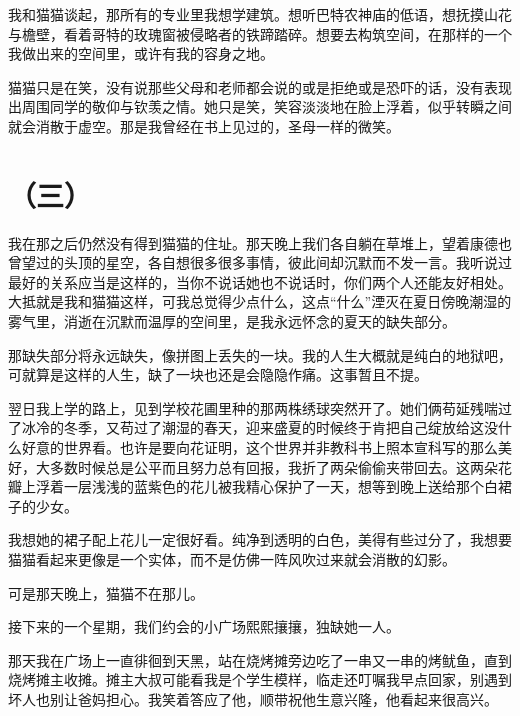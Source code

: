 \documentclass{article}
\begin{document}
我和猫猫谈起，那所有的专业里我想学建筑。想听巴特农神庙的低语，想抚摸山花与檐壁，看着哥特的玫瑰窗被侵略者的铁蹄踏碎。想要去构筑空间，在那样的一个我做出来的空间里，或许有我的容身之地。



猫猫只是在笑，没有说那些父母和老师都会说的或是拒绝或是恐吓的话，没有表现出周围同学的敬仰与钦羡之情。她只是笑，笑容淡淡地在脸上浮着，似乎转瞬之间就会消散于虚空。那是我曾经在书上见过的，圣母一样的微笑。





{\centering\section*{（三）}}





我在那之后仍然没有得到猫猫的住址。那天晚上我们各自躺在草堆上，望着康德也曾望过的头顶的星空，各自想很多很多事情，彼此间却沉默而不发一言。我听说过最好的关系应当是这样的，当你不说话她也不说话时，你们两个人还能友好相处。大抵就是我和猫猫这样，可我总觉得少点什么，这点“什么”湮灭在夏日傍晚潮湿的雾气里，消逝在沉默而温厚的空间里，是我永远怀念的夏天的缺失部分。



那缺失部分将永远缺失，像拼图上丢失的一块。我的人生大概就是纯白的地狱吧，可就算是这样的人生，缺了一块也还是会隐隐作痛。这事暂且不提。



翌日我上学的路上，见到学校花圃里种的那两株绣球突然开了。她们俩苟延残喘过了冰冷的冬季，又苟过了潮湿的春天，迎来盛夏的时候终于肯把自己绽放给这没什么好意的世界看。也许是要向花证明，这个世界并非教科书上照本宣科写的那么美好，大多数时候总是公平而且努力总有回报，我折了两朵偷偷夹带回去。这两朵花瓣上浮着一层浅浅的蓝紫色的花儿被我精心保护了一天，想等到晚上送给那个白裙子的少女。



我想她的裙子配上花儿一定很好看。纯净到透明的白色，美得有些过分了，我想要猫猫看起来更像是一个实体，而不是仿佛一阵风吹过来就会消散的幻影。



可是那天晚上，猫猫不在那儿。



接下来的一个星期，我们约会的小广场熙熙攘攘，独缺她一人。



那天我在广场上一直徘徊到天黑，站在烧烤摊旁边吃了一串又一串的烤鱿鱼，直到烧烤摊主收摊。摊主大叔可能看我是个学生模样，临走还叮嘱我早点回家，别遇到坏人也别让爸妈担心。我笑着答应了他，顺带祝他生意兴隆，他看起来很高兴。
\end{document}
